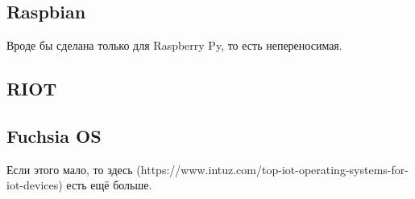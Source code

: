 \subsection{Raspbian}

Вроде бы сделана только для Raspberry Py, то есть непереносимая.



\subsection{RIOT}



\subsection{Fuchsia OS}



Если этого мало, то здесь (https://www.intuz.com/top-iot-operating-systems-for-iot-devices) есть ещё больше.




